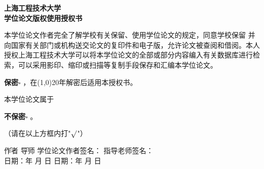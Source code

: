 
\newpage
\begin{center}\heiti\sanhao\textbf{
    上海工程技术大学 \\
    学位论文版权使用授权书}
\end{center}

本学位论文作者完全了解学校有关保留、使用学位论文的规定，同意学校保留
并向国家有关部门或机构送交论文的复印件和电子版，允许论文被查阅和借阅。本人
授权上海工程技术大学可以将本学位论文的全部或部分内容编入有关数据库进行检
索，可以采用影印、缩印或扫描等复制手段保存和汇编本学位论文。

\hspace{7em}\textbf{保密}$\square$ ，在\line(1,0){20}年解密后适用本授权书。

本学位论文属于

\hspace{7em}\textbf{不保密}$\square$ 。

（请在以上方框内打\quad "\emph{$\surd$}"）

\vspace{15em}
\begin{tabbing}
    \qquad \= 作者 \hspace{15em} \= 导师 \kill
    \> 学位论文作者签名： \> 指导老师签名： \\
    \> 日期：\qquad 年 \qquad 月 \qquad 日 \> 日期：\qquad 年 \qquad 月 \qquad 日
\end{tabbing}  

